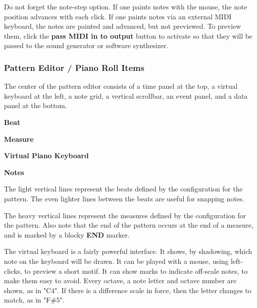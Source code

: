    Do not forget the note-step option.
   If one paints notes with the mouse,
   the note position advances with each click.
   If one paints notes via an external MIDI keyboard, the notes are painted and
   advanced, but not previewed.
   To preview them, click the
   \textbf{pass MIDI in to output} button to activate so that they will be
   passed to the sound generator or software synthesizer.

\subsubsection{Pattern Editor / Piano Roll Items}
\label{subsubsec:pattern_editor_piano_roll_items}

   The center of the pattern editor consists of a time panel at the top,
   a virtual keyboard at the left, a note grid, a vertical scrollbar, an event
   panel, and a data panel at the bottom.

   \begin{enumber}
      \item \textbf{Beat}
      \item \textbf{Measure}
      \item \textbf{Virtual Piano Keyboard}
      \item \textbf{Notes}
   \end{enumber}

   \setcounter{ItemCounter}{0}      %

   The light vertical lines represent the beats defined by the configuration
   for the pattern.  The even lighter lines between the beats are useful for
   snapping notes.

   The heavy vertical lines represent the measures defined by the
   configuration for the pattern.
   Also note that the end of the pattern
   occurs at the end of a measure, and is marked by a blocky \textbf{END}
   marker.

   The virtual keyboard is a fairly powerful interface.  It shows,
   by shadowing, which note on the keyboard will be drawn. It can be
   played with a mouse, using left-clicks, to preview a short motif.
   It can show marks to indicate off-scale notes, to make them easy to
   avoid.  Every octave, a note letter and octave number are shown, as in
   "C4".  If there is a difference scale in force, then the letter changes to
   match, as in "F\#5".

